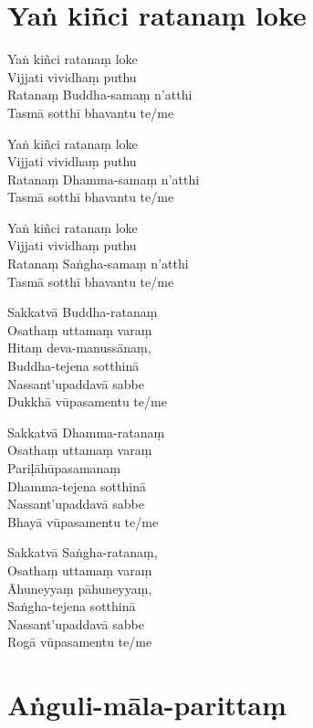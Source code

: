 \chapter{Yaṅ kiñci ratanaṃ loke}%

\begin{paritta}
Yaṅ kiñci ratanaṃ loke\\
Vijjati vividhaṃ puthu\\
Ratanaṃ Buddha-samaṃ n'atthi\\
Tasmā sotthī bhavantu te/me

Yaṅ kiñci ratanaṃ loke\\
Vijjati vividhaṃ puthu\\
Ratanaṃ Dhamma-samaṃ n'atthi\\
Tasmā sotthī bhavantu te/me

Yaṅ kiñci ratanaṃ loke\\
Vijjati vividhaṃ puthu\\
Ratanaṃ Saṅgha-samaṃ n'atthi\\
Tasmā sotthī bhavantu te/me

Sakkatvā Buddha-ratanaṃ\\
Osathaṃ uttamaṃ varaṃ\\
Hitaṃ deva-manussānaṃ,\\
Buddha-tejena sotthinā\\
Nassant'upaddavā sabbe\\
Dukkhā vūpasamentu te/me

Sakkatvā Dhamma-ratanaṃ\\
Osathaṃ uttamaṃ varaṃ\\
Pariḷāhūpasamanaṃ\\
Dhamma-tejena sotthinā\\
Nassant'upaddavā sabbe\\
Bhayā vūpasamentu te/me

Sakkatvā Saṅgha-ratanaṃ,\\
Osathaṃ uttamaṃ varaṃ\\
Āhuneyyaṃ pāhuneyyaṃ,\\
Saṅgha-tejena sotthinā\\
Nassant'upaddavā sabbe\\
Rogā vūpasamentu te/me
\end{paritta}

\enlargethispage{\baselineskip}

\chapter{Aṅguli-māla-parittaṃ}%

